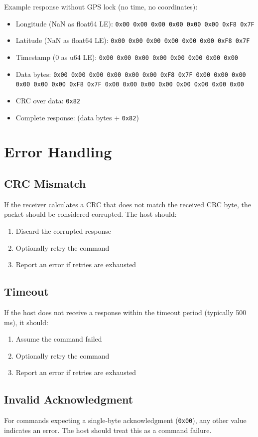 \documentclass[12pt, titlepage]{article}
\begin{document}
Example response without GPS lock (no time, no coordinates):
\begin{itemize}
  \item Longitude (NaN as float64 LE): \texttt{0x00 0x00 0x00 0x00 0x00 0x00 0xF8 0x7F}
  \item Latitude (NaN as float64 LE): \texttt{0x00 0x00 0x00 0x00 0x00 0x00 0xF8 0x7F}
  \item Timestamp (0 as u64 LE): \texttt{0x00 0x00 0x00 0x00 0x00 0x00 0x00 0x00}
  \item Data bytes: \texttt{0x00 0x00 0x00 0x00 0x00 0x00 0xF8 0x7F 0x00 0x00 0x00 0x00
          0x00 0x00 0xF8 0x7F 0x00 0x00 0x00 0x00 0x00 0x00 0x00 0x00}
  \item CRC over data: \texttt{0x82}
  \item Complete response: (data bytes + \texttt{0x82})
\end{itemize}

\section{Error Handling}

\subsection{CRC Mismatch}
If the receiver calculates a CRC that does not match the received CRC byte, the
packet should be considered corrupted. The host should:
\begin{enumerate}
  \item Discard the corrupted response
  \item Optionally retry the command
  \item Report an error if retries are exhausted
\end{enumerate}

\subsection{Timeout}
If the host does not receive a response within the timeout period (typically
500 ms), it should:
\begin{enumerate}
  \item Assume the command failed
  \item Optionally retry the command
  \item Report an error if retries are exhausted
\end{enumerate}

\subsection{Invalid Acknowledgment}
For commands expecting a single-byte acknowledgment (\texttt{0x00}), any other
value indicates an error. The host should treat this as a command failure.
\end{document}
